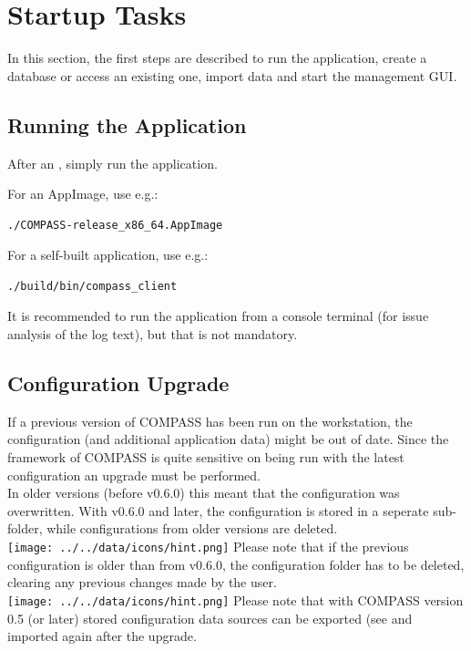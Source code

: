 \chapter{Startup Tasks}
\label{sec:tasks} 

In this section, the first steps are described to run the application, create a database or access an existing one, import data and start the management GUI.

\section{Running the Application}

After an , simply run the application.

For an AppImage, use e.g.:
\begin{lstlisting}
./COMPASS-release_x86_64.AppImage
\end{lstlisting}

For a self-built application, use e.g.:
\begin{lstlisting}
./build/bin/compass_client
\end{lstlisting}

It is recommended to run the application from a console terminal (for issue analysis of the log text), but that is not mandatory.

\section{Configuration Upgrade}

If a previous version of COMPASS has been run on the workstation, the configuration (and additional application data) might be out of date. Since the framework of COMPASS is quite sensitive on being run with the latest configuration an upgrade must be performed. \\

In older versions (before v0.6.0) this meant that the configuration was overwritten. With v0.6.0 and later, the configuration is stored in a seperate sub-folder, while configurations from older versions are deleted. \\

\texttt{[image: ../../data/icons/hint.png]} Please note that if the previous configuration is older than from v0.6.0, the configuration folder has to be deleted, clearing any previous changes made by the user. \\

\texttt{[image: ../../data/icons/hint.png]} Please note that with COMPASS version 0.5 (or later) stored configuration data sources can be exported (see  and imported again after the upgrade. \\

